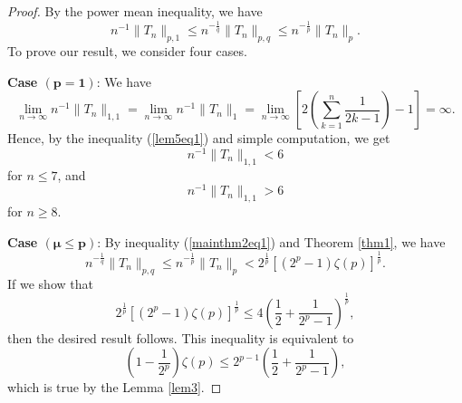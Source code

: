 \documentclass{amsart}
\begin{document}
\begin{proof} By the power mean inequality, we have
\begin{equation}\label{mainthm2eq1}
n^{-1}\|T_n\|_{p,1}\leq n^{-\frac{1}{q}}\|T_n\|_{p,q}\leq n^{-\frac{1}{p}}\|T_n\|_{p}.
\end{equation}
To prove our result, we consider four cases.

{\bf Case $\boldsymbol{(p=1)}$}: We have 
$$  \lim_{n\to\infty}n^{-1}\|T_n\|_{1,1}=\lim_{n\to\infty}n^{-1}\|T_n\|_{1}=\lim_{n\to\infty}\left[2\left(\sum_{k=1}^n\frac{1}{2k-1}\right)-1\right]=\infty.
$$
Hence, by the inequality (\ref{lem5eq1}) and simple computation, we get
$$n^{-1}\|T_n\|_{1,1}<6$$
for $n\leq7$, and
$$n^{-1}\|T_n\|_{1,1}>6$$
for $n\geq8$.

{\bf Case $\boldsymbol{(\mu\leq p)}$}: By inequality (\ref{mainthm2eq1}) and Theorem \ref{thm1}, we have
$$n^{-\frac{1}{q}}\|T_n\|_{p,q}\leq n^{-\frac{1}{p}}\|T_n\|_{p}<2^{\frac{1}{p}}\left[(2^p-1)\zeta(p)\right]^{\frac{1}{p}}.$$
If we show that 
$$2^{\frac{1}{p}}\left[(2^p-1)\zeta(p)\right]^{\frac{1}{p}}\leq4\left(\frac{1}{2}+\frac{1}{2^p-1}\right)^{\frac{1}{p}},$$
then the desired result follows. This inequality is equivalent to
$$\left(1-\frac{1}{2^p}\right)\zeta(p)\leq 2^{p-1}\left(\frac{1}{2}+\frac{1}{2^p-1}\right),$$
which is true by the Lemma \ref{lem3}.


\end{proof}
\end{document}
